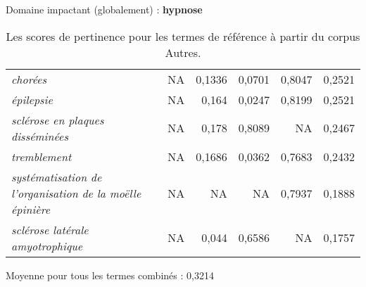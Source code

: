 \begin{frame}{Domaine impactant (globalement) : \textbf{hypnose}}
\begin{table}[h]
{\begin{tabular}{|l|r|r|r|r|r|}
				\textit{chorées} & NA & 0,1336 & 0,0701 & 0,8047 & 0,2521 \\
				\textit{épilepsie} & NA & 0,164 & 0,0247 & 0,8199 & 0,2521 \\
				\textit{sclérose en plaques disséminées} & NA  & 0,178 & 0,8089 & NA & 0,2467 \\
				\textit{tremblement} & NA & 0,1686 & 0,0362 & 0,7683 & 0,2432 \\
				\textit{systématisation de l'organisation de la moëlle épinière} & NA & NA & NA & 0,7937 & 0,1888 \\
				\textit{sclérose latérale amyotrophique} & NA & 0,044 & 0,6586 & NA & 0,1757 \\
				\hline
			\end{tabular}
		}
		\caption{Les scores de pertinence pour les termes de référence à partir du corpus \og{}Autres\fg{}.}
	\end{table}
	{\small Moyenne pour tous les termes combinés : 0,3214}
\end{frame}





